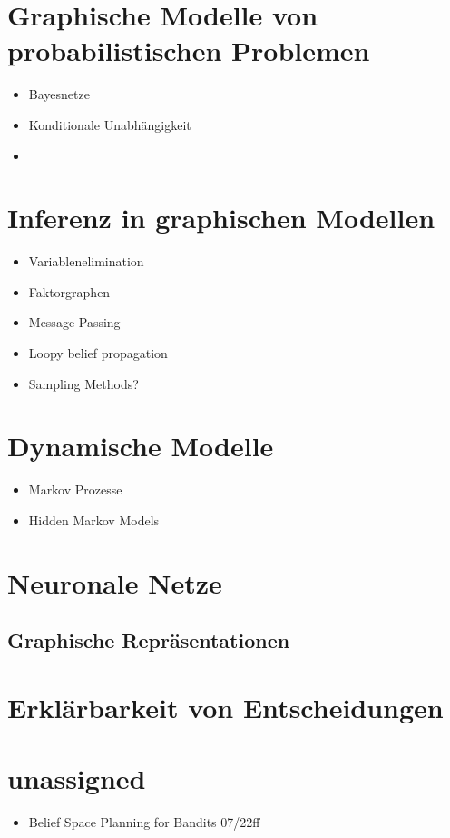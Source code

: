 \documentclass[ngerman]{../LaTeX-Templates/Paper/paper}
\begin{document}
\section{Graphische Modelle von probabilistischen Problemen}
\begin{itemize}
	\item Bayesnetze
	\item Konditionale Unabhängigkeit
	\item 
\end{itemize}

\section{Inferenz in graphischen Modellen}
\begin{itemize}
	\item Variablenelimination
	\item Faktorgraphen
	\item Message Passing
	\item Loopy belief propagation
	\item Sampling Methods?
\end{itemize}


\section{Dynamische Modelle}
\begin{itemize}
	\item Markov Prozesse
	\item Hidden Markov Models
\end{itemize}


\section{Neuronale Netze}
\subsection{Graphische Repräsentationen}


\section{Erklärbarkeit von Entscheidungen}







\section{unassigned}
\begin{itemize}
	\item Belief Space Planning for Bandits 07/22ff
\end{itemize}
\end{document}
